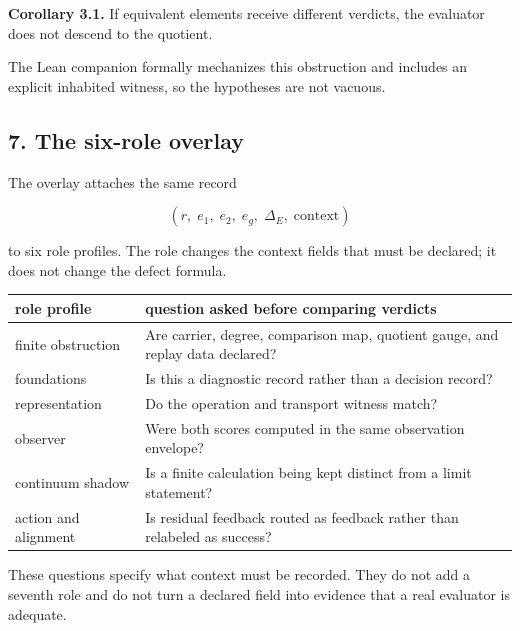 \documentclass[
  11pt,
]{article}
\theoremstyle{plain}
\theoremstyle{definition}\newtheorem{definition}[theorem]{Definition}
\theoremstyle{remark}\newtheorem*{remark}{Remark}
\begin{document}
\textbf{Corollary 3.1.} If equivalent elements receive different
verdicts, the evaluator does not descend to the quotient.

The Lean companion formally mechanizes this obstruction and includes an explicit inhabited
witness, so the hypotheses are not vacuous.

\subsection{7. The six-role overlay}\label{the-six-role-overlay}

The overlay attaches the same record

\[
(r,\;e_1,\;e_2,\;e_g,\;\Delta_E,\;\text{context})
\]

to six role profiles. The role changes the context fields that must be
declared; it does not change the defect formula.

\begin{longtable}[]{@{}
  >{\raggedright\arraybackslash}p{}
  >{\raggedright\arraybackslash}p{}@{}}
\toprule\noalign{}
\begin{minipage}[b]{\linewidth}\raggedright
role profile
\end{minipage} & \begin{minipage}[b]{\linewidth}\raggedright
question asked before comparing verdicts
\end{minipage} \\
\midrule\noalign{}
\endhead
\bottomrule\noalign{}
\endlastfoot
finite obstruction & Are carrier, degree, comparison map, quotient gauge, and replay data declared? \\
foundations & Is this a diagnostic record rather than a decision record? \\
representation & Do the operation and transport witness match? \\
observer & Were both scores computed in the same observation envelope? \\
continuum shadow & Is a finite calculation being kept distinct from a limit statement? \\
action and alignment & Is residual feedback routed as feedback rather than relabeled as success? \\
\end{longtable}

These questions specify what context must be recorded. They do not add a
seventh role and do not turn a declared field into evidence that a real
evaluator is adequate.
\end{document}
